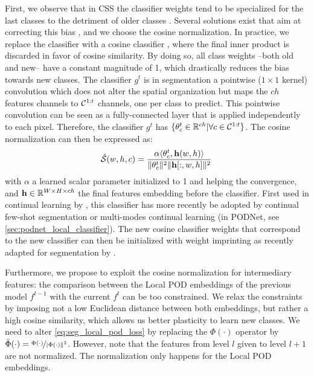 First, we observe that in \ac{CSS} the classifier weights tend to be specialized for the last
classes to the detriment of older classes \citep{hou2019ucir}. Several solutions exist that aim at
correcting this bias
\citep{wu2019bias_correction,belouadah2019il2m,zhao2020weightalignement,luo2018cosine_classifier},
and we choose the cosine normalization. In practice, we replace the classifier with a cosine
classifier \citep{luo2018cosine_classifier}, where the final inner product is discarded in favor of
cosine similarity. By doing so, all class weights --both old and new-- have a constant magnitude of
1, which drastically reduces the bias towards new classes. The classifier $g^t$ is in segmentation a
pointwise ($1\times1$ kernel) convolution which does not alter the spatial organization but maps the
$ch$ features channels to $\mathcal{C}^{1:t}$ channels, one per class to predict. This pointwise
convolution can be seen as a fully-connected layer that is applied independently to each pixel.
Therefore, the classifier $g^t$ has $\{\theta_c^t \in \mathbb{R}^{ch} | \forall c \in \mathcal{C}^{1:t}\}$.
The cosine normalization can then be expressed as:
%
\begin{equation}
    \hat{\mathcal{S}}(w, h, c) = \frac{\alpha \langle \theta^t_c, \mathbf{h}(w, h) \rangle}{\Vert \theta^t_c \Vert^2 \Vert \mathbf{h}[:,w, h] \Vert^2}\,
    \label{eq:seg_cosine_classifier}
\end{equation}
%
\noindent with $\alpha$ a learned scalar parameter initialized to 1 and helping the convergence, and
$\mathbf{h} \in \mathbb{R}^{W \times H \times ch}$ the final features embedding before the classifier.
First used in continual learning by \citet{hou2019ucir}, this classifier has more recently be
adopted by continual few-shot segmentation \citep{cermelli2020fewshotcontinualsegm} or
multi-modes continual learning (in PODNet, see \autoref{sec:podnet_local_classifier}). The new
cosine classifier weights that correspond to the new classifier can then be initialized with
weight imprinting \citep{qi2018imprintedweights} as recently adapted for segmentation by
\citet{cermelli2020fewshotcontinualsegm}.

Furthermore, we propose to exploit the cosine normalization for intermediary features: the
comparison between the Local POD embeddings of the previous model $f^{t-1}$ with the current $f^t$
can be too constrained. We relax the constraints by imposing not a low Euclidean distance between
both embeddings, but rather a high cosine similarity, which allows us better plasticity to learn new
classes. We need to alter \autoref{eq:seg_local_pod_loss} by replacing the $\Phi(\cdot)$ operator by
$\bar{\Phi}(\cdot) = \nicefrac{\Phi(\cdot)}{\vert\Phi(\cdot)\Vert^2}$. However, note that the
features from level $l$ given to level $l+1$ are not normalized. The normalization only happens for
the Local POD embeddings.


